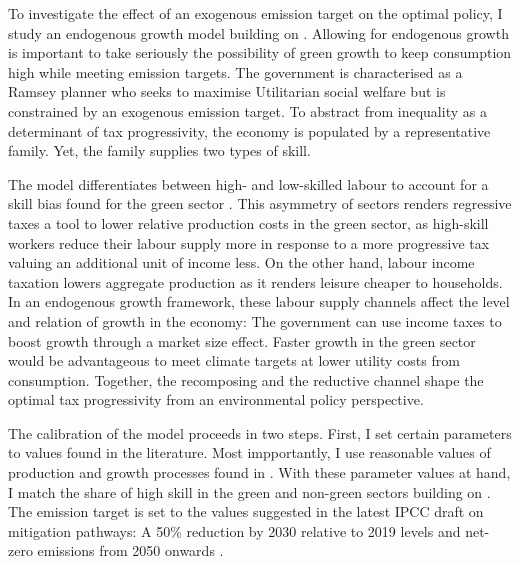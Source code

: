 To investigate the effect of an exogenous emission target on the optimal policy, I study an endogenous growth model building on \cite{Fried2018ClimateAnalysis}. Allowing for endogenous growth is important to take seriously the possibility of green growth to keep consumption high while meeting emission targets. The government is characterised as a Ramsey planner who seeks to maximise Utilitarian social welfare but is constrained by an exogenous emission target. To abstract from inequality as a determinant of tax progressivity, the economy is populated by a representative family. Yet, the family supplies two types of skill. 

The model differentiates between high- and low-skilled labour to account for a skill bias found for the green sector \citep{Consoli2016DoCapital}. This asymmetry of sectors renders regressive taxes a tool to lower relative production costs in the green sector, as high-skill workers reduce their labour supply more in response to a more progressive tax valuing an additional unit of income less. %
On the other hand, labour income taxation lowers aggregate production as it renders leisure cheaper to households. 
In an endogenous growth framework, these labour supply channels affect the level and relation of growth in the economy: The government can use income taxes to boost growth through a market size effect. Faster growth in the green sector would be advantageous to meet climate targets at lower utility costs from consumption. Together, the recomposing and the reductive channel shape the optimal tax progressivity from an environmental policy perspective. 

The calibration of the model proceeds in two steps. First, I set certain parameters to values found in the literature. Most impportantly, I use reasonable values of production and growth processes found in \cite{Fried2018ClimateAnalysis}. %
With these parameter values at hand, I match the share of high skill in the green and non-green sectors building on \cite{Consoli2016DoCapital}. The emission target is set to the values suggested in the latest IPCC draft on mitigation pathways: A 50\% reduction by 2030 relative to 2019 levels and  net-zero emissions from 2050 onwards \citep{IPCC2022}.

